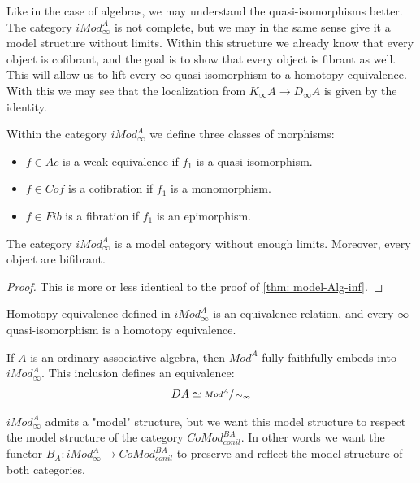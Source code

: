 \documentclass[../thesis.tex]{subfiles}
\begin{document}
            Like in the case of algebras, we may understand the quasi-isomorphisms better. The category $iMod_\infty^A$ is not complete, but we may in the same sense give it a model structure without limits. Within this structure we already know that every object is cofibrant, and the goal is to show that every object is fibrant as well. This will allow us to lift every $\infty$-quasi-isomorphism to a homotopy equivalence. With this we may see that the localization from $K_\infty A \to D_\infty A$ is given by the identity.

            Within the category $iMod_\infty^A$ we define three classes of morphisms:
            \begin{itemize}
                \item $f\in Ac$ is a weak equivalence if $f_1$ is a quasi-isomorphism.
                \item $f\in Cof$ is a cofibration if $f_1$ is a monomorphism.
                \item $f\in Fib$ is a fibration if $f_1$ is an epimorphism.
            \end{itemize}

            \begin{thm}
                The category $iMod_\infty^A$ is a model category without enough limits. Moreover, every object are bifibrant.
            \end{thm}

            \begin{proof}
                This is more or less identical to the proof of \ref{thm: model-Alg-inf}.
            \end{proof}

            \begin{corollary}
                Homotopy equivalence defined in $iMod_\infty^A$ is an equivalence relation, and every $\infty$-quasi-isomorphism is a homotopy equivalence.

                If $A$ is an ordinary associative algebra, then $Mod^A$ fully-faithfully embeds into $iMod_\infty^A$. This inclusion defines an equivalence:
                \begin{align*}
                    DA \simeq \sfrac{Mod^A}{\sim_\infty}
                \end{align*}
            \end{corollary}

            $iMod_\infty^A$ admits a "model" structure, but we want this model structure to respect the model structure of the category $CoMod_{conil}^{BA}$. In other words we want the functor $B_A : iMod_\infty^A \to CoMod_{conil}^{BA}$ to preserve and reflect the model structure of both categories.
\end{document}
